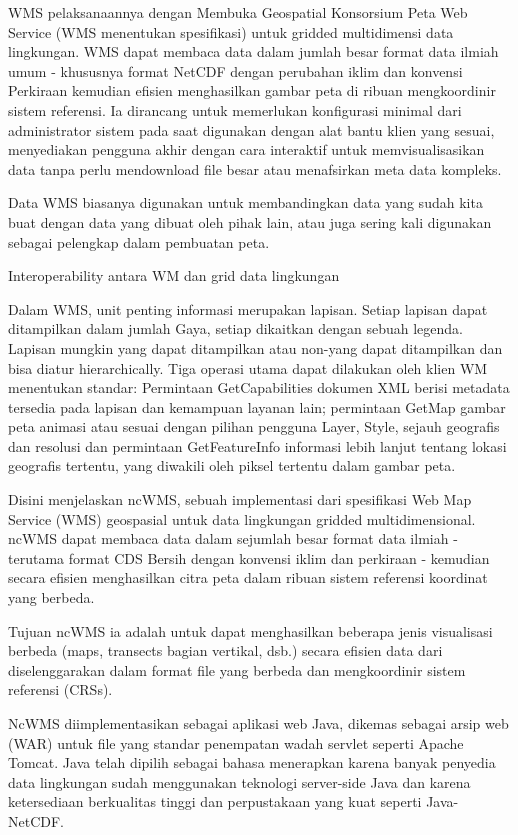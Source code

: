    WMS pelaksanaannya dengan Membuka Geospatial Konsorsium Peta Web Service (WMS menentukan spesifikasi) untuk gridded multidimensi data lingkungan. WMS dapat membaca data dalam jumlah besar format data ilmiah umum - khususnya format NetCDF dengan perubahan iklim dan konvensi Perkiraan kemudian efisien menghasilkan gambar peta di ribuan mengkoordinir sistem referensi. Ia dirancang untuk memerlukan konfigurasi minimal dari administrator sistem pada saat digunakan dengan alat bantu klien yang sesuai, menyediakan pengguna akhir dengan cara interaktif untuk memvisualisasikan data tanpa perlu mendownload file besar atau menafsirkan meta data kompleks. 

Data WMS biasanya digunakan untuk membandingkan data yang sudah kita buat dengan data yang dibuat oleh pihak lain, atau juga sering kali
digunakan sebagai pelengkap dalam pembuatan peta.

Interoperability antara WM dan grid data lingkungan

Dalam WMS, unit penting informasi merupakan lapisan. Setiap lapisan dapat ditampilkan dalam jumlah Gaya, setiap dikaitkan dengan sebuah
legenda. Lapisan mungkin yang dapat ditampilkan atau non-yang dapat ditampilkan dan bisa diatur hierarchically. Tiga operasi utama dapat
dilakukan oleh klien WM menentukan standar: Permintaan GetCapabilities dokumen XML berisi metadata tersedia pada lapisan dan kemampuan
layanan lain; permintaan GetMap gambar peta animasi atau sesuai dengan pilihan pengguna Layer, Style, sejauh geografis dan resolusi dan
permintaan GetFeatureInfo informasi lebih lanjut tentang lokasi geografis tertentu, yang diwakili oleh piksel tertentu dalam gambar
peta.

Disini menjelaskan ncWMS, sebuah implementasi dari spesifikasi Web Map Service (WMS) geospasial untuk data lingkungan gridded multidimensional. ncWMS dapat membaca data dalam sejumlah besar format data ilmiah - terutama format CDS Bersih dengan konvensi iklim dan perkiraan - kemudian secara efisien menghasilkan citra peta dalam ribuan sistem referensi koordinat yang berbeda.

Tujuan ncWMS ia adalah untuk dapat menghasilkan beberapa jenis visualisasi berbeda (maps, transects bagian vertikal, dsb.) secara efisien data dari diselenggarakan dalam format file yang berbeda dan mengkoordinir sistem referensi (CRSs).

NcWMS diimplementasikan sebagai aplikasi web Java, dikemas sebagai arsip web (WAR) untuk file yang standar penempatan wadah servlet seperti Apache Tomcat. Java telah dipilih sebagai bahasa menerapkan karena banyak penyedia data lingkungan sudah menggunakan teknologi server-side Java dan karena ketersediaan berkualitas tinggi dan perpustakaan yang kuat seperti Java-NetCDF.

